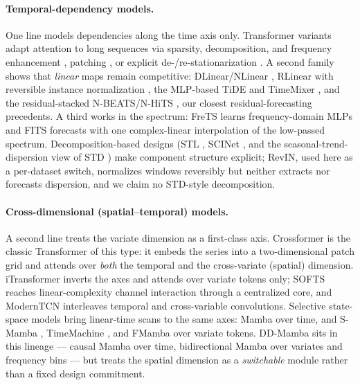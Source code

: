 \documentclass[runningheads]{llncs}
\newcommand{\model}{DD-Mamba}
\begin{document}
\paragraph{Temporal-dependency models.} One line models dependencies along
the time axis only. Transformer variants adapt attention to long sequences
via sparsity, decomposition, and frequency enhancement
\cite{informer,autoformer,fedformer}, patching \cite{patchtst}, or explicit
de-/re-stationarization \cite{nonstationary}. A second family shows that
\emph{linear} maps remain competitive: DLinear/NLinear \cite{dlinear},
RLinear with reversible instance normalization \cite{rlinear,revin}, the
MLP-based TiDE \cite{tide} and TimeMixer \cite{timemixer}, and the
residual-stacked N-BEATS/N-HiTS \cite{nbeats,nhits}, our closest
residual-forecasting precedents. A third works in the spectrum: FreTS
\cite{frets} learns frequency-domain MLPs and FITS \cite{fits} forecasts
with one complex-linear interpolation of the low-passed spectrum.
Decomposition-based designs (STL \cite{stl}, SCINet \cite{scinet}, and the
seasonal-trend-dispersion view of STD \cite{std}) make component structure
explicit; RevIN, used here as a per-dataset switch, normalizes windows
reversibly but neither extracts nor forecasts dispersion, and we claim no
STD-style decomposition.

\paragraph{Cross-dimensional (spatial--temporal) models.} A second line
treats the variate dimension as a first-class axis. Crossformer
\cite{crossformer} is the classic Transformer of this type: it embeds the
series into a two-dimensional patch grid and attends over \emph{both} the
temporal and the cross-variate (spatial) dimension. iTransformer
\cite{itransformer} inverts the axes and attends over variate tokens only;
SOFTS \cite{softs} reaches linear-complexity channel interaction through a
centralized core, and ModernTCN \cite{moderntcn} interleaves temporal and
cross-variable convolutions. Selective state-space models bring linear-time
scans to the same axes: Mamba \cite{mamba,mamba2} over time, and S-Mamba
\cite{smamba}, TimeMachine \cite{timemachine}, and FMamba \cite{fmamba}
over variate tokens. \model{} sits in this lineage --- causal Mamba over
time, bidirectional Mamba over variates and frequency bins --- but treats
the spatial dimension as a \emph{switchable} module rather than a fixed
design commitment.
\end{document}
